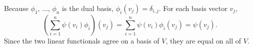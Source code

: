 
\begin{csp}
    Because $\phi_1$, $\dots$, $\phi_n$ is the dual basis, $\phi_i (v_j)=\delta_{i,j}$.
	For each basis vector $v_j$,
    $$\left(\sum^{n}_{i=1} \psi(v_i) \phi_i \right)(v_j)=\sum^{n}_{i=1} \psi(v_i) \phi_i (v_j)=\psi(v_j).$$
    Since the two linear functionals agree on a basis of $V$, they are equal on all of $V$.
\end{csp}